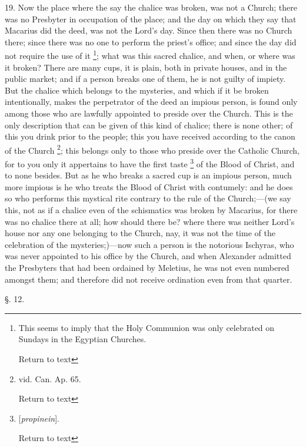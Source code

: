 19. Now the place where the say the chalice was
broken, was not a Church; there was no Presbyter in occupation of the
place; and the day on which they say that Macarius did the deed, was
not the Lord's day. Since then there was no Church there; since there
was no one to perform the priest's office; and since the day did not
require the use of it \footnote{This seems to imply that the Holy Communion was only celebrated on
Sundays in the Egyptian Churches.

Return to text};
what was this sacred chalice, and when, or where was it broken? There
are many cups, it is plain, both in private houses, and in the public
market; and if a person breaks one of them, he is not guilty of
impiety. But the chalice which belongs to the mysteries, and which if
it be broken intentionally, makes the perpetrator of the deed an
impious person, is found only among those who are lawfully appointed
to preside over the Church. This is the only description that can be
given of this kind of chalice; there is none other; of this you drink
prior to the people; this you have received according to the canon of
the Church \footnote{vid. Can. Ap. 65.

Return to text}; this
belongs only to those who preside over the Catholic Church, for
to you only it appertains to have the first taste \footnote{[\emph{propinein}].

Return to text} of the Blood of Christ, and to none besides. But as he who
breaks a sacred cup is an impious person, much more impious is he who
treats the Blood of Christ with contumely: and he does so who performs
this mystical rite contrary to the rule of the Church;—(we say this,
not as if a chalice even of the schismatics was broken by Macarius,
for there was no chalice there at all; how should there be? where
there was neither Lord's house nor any one belonging to the Church,
nay, it was not the time of the celebration of the mysteries;)—now
such a person is the notorious Ischyras, who was never appointed to
his office by the Church, and when Alexander admitted the Presbyters
that had been ordained by Meletius, he was not even numbered amongst
them; and therefore did not receive ordination even from that quarter.

§. 12.

